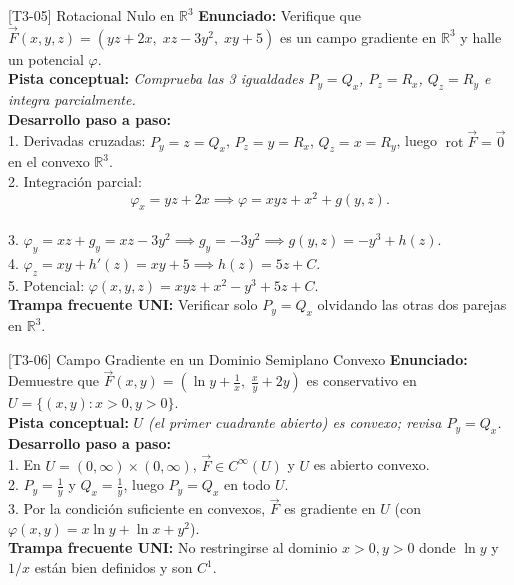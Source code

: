 \documentclass[11pt,a4paper]{article}
\begin{document}
\begin{ejerciciobox}{[T3-05] Rotacional Nulo en $\mathbb{R}^3$}
\textbf{Enunciado:} Verifique que $\vec{F}(x,y,z) = (yz + 2x,\; xz - 3y^2,\; xy + 5)$ es un campo gradiente en $\mathbb{R}^3$ y halle un potencial $\varphi$.\\[0.2cm]
\textbf{Pista conceptual:} \emph{Comprueba las 3 igualdades $P_y=Q_x$, $P_z=R_x$, $Q_z=R_y$ e integra parcialmente.}\\[0.2cm]
\textbf{Desarrollo paso a paso:}\\
1. Derivadas cruzadas: $P_y = z = Q_x$, $P_z = y = R_x$, $Q_z = x = R_y$, luego $\operatorname{rot}\vec{F} = \vec{0}$ en el convexo $\mathbb{R}^3$.\\
2. Integración parcial:\\
$$\varphi_x = yz + 2x \implies \varphi = xyz + x^2 + g(y,z).$$\\
3. $\varphi_y = xz + g_y = xz - 3y^2 \implies g_y = -3y^2 \implies g(y,z) = -y^3 + h(z)$.\\
4. $\varphi_z = xy + h'(z) = xy + 5 \implies h(z) = 5z + C$.\\
5. Potencial: $\varphi(x,y,z) = xyz + x^2 - y^3 + 5z + C$.\\[0.2cm]
\textbf{Trampa frecuente UNI:} Verificar solo $P_y = Q_x$ olvidando las otras dos parejas en $\mathbb{R}^3$.
\end{ejerciciobox}

\begin{ejerciciobox}{[T3-06] Campo Gradiente en un Dominio Semiplano Convexo}
\textbf{Enunciado:} Demuestre que $\vec{F}(x,y) = (\ln y + \frac{1}{x},\; \frac{x}{y} + 2y)$ es conservativo en $U = \{(x,y) : x > 0, y > 0\}$.\\[0.2cm]
\textbf{Pista conceptual:} \emph{$U$ (el primer cuadrante abierto) es convexo; revisa $P_y = Q_x$.}\\[0.2cm]
\textbf{Desarrollo paso a paso:}\\
1. En $U = (0,\infty)\times(0,\infty)$, $\vec{F} \in C^\infty(U)$ y $U$ es abierto convexo.\\
2. $P_y = \frac{1}{y}$ y $Q_x = \frac{1}{y}$, luego $P_y = Q_x$ en todo $U$.\\
3. Por la condición suficiente en convexos, $\vec{F}$ es gradiente en $U$ (con $\varphi(x,y) = x\ln y + \ln x + y^2$).\\[0.2cm]
\textbf{Trampa frecuente UNI:} No restringirse al dominio $x > 0, y > 0$ donde $\ln y$ y $1/x$ están bien definidos y son $C^1$.
\end{ejerciciobox}
\end{document}
